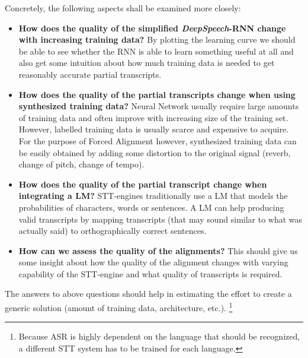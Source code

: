 Concretely, the following aspects shall be examined more closely:

\begin{itemize}
	\item \textbf{How does the quality of the simplified \textit{DeepSpeech}-\ac{RNN} change with increasing training data?} By plotting the learning curve we should be able to see whether the RNN is able to learn something useful at all and also get some intuition about how much training data is needed to get reasonably accurate partial transcripts.
	\item \textbf{How does the quality of the partial transcripts change when using synthesized training data?} Neural Network usually require large amounts of training data and often improve with increasing size of the training set. However, labelled training data is usually scarce and expensive to acquire. For the purpose of Forced Alignment however, synthesized training data can be easily obtained by adding some distortion to the original signal (reverb, change of pitch, change of tempo).
	\item \textbf{How does the quality of the partial transcript change when integrating a \ac{LM}?} \ac{STT}-engines traditionally use a \ac{LM} that models the probabilities of characters, words or sentences. A \ac{LM} can help producing valid transcripts by mapping transcripts (that may sound similar to what was actually said) to orthographically correct sentences.
	\item \textbf{How can we assess the quality of the alignments?} This should give us some insight about how the quality of the alignment changes with varying capability of the \ac{STT}-engine and what quality of transcripts is required.
\end{itemize}

The answers to above questions should help in estimating the effort to create a generic solution (amount of training data, architecture, etc.). \footnote{Because \ac{ASR} is highly dependent on the language that should be recognized, a different \ac{STT} system has to be trained for each language.}

